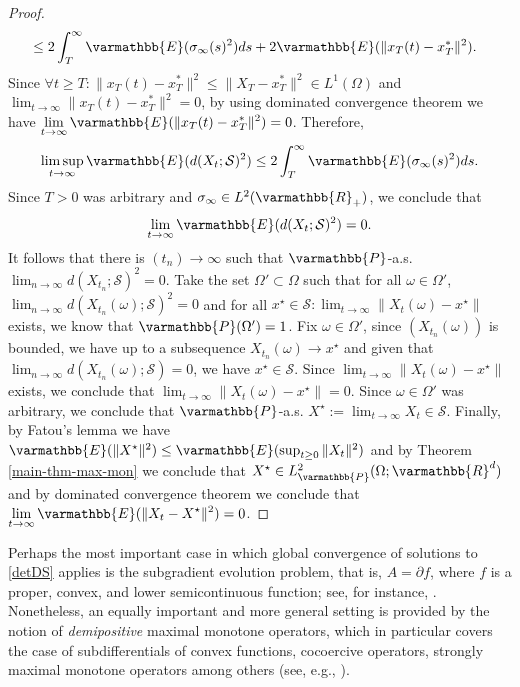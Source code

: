 \documentclass[11pt,reqno]{article}
\let\mathbb=\varmathbb
\newcommand{\R}{\mathbb{R}}
\newcommand{\1}{\mathds{1}}
\numberwithin{equation}{section}  %
\theoremstyle{plain}
\theoremstyle{definition}
\theoremstyle{remark}
\numberwithin{theorem}{section}
\numberwithin{remark}{section}
\numberwithin{example}{section}
\begin{document}
\begin{proof}
\begin{equation*}
\begin{aligned}
        &\leq 2\int_T^\infty \mathbb{E}(\sigma_\infty(s)^2) ds + 2\mathbb{E}(\|x_T(t)-x_T^\ast\|^2). 
    \end{aligned}
\end{equation*}
Since $\forall t\geq T : \|x_T(t)-x_T^\ast\|^2\leq \|X_T-x_T^\ast\|^2\in L^1(\Omega)$ and $\displaystyle\lim_{t\to \infty}\|x_T(t)-x_T^\ast\|^2 = 0$, by using dominated convergence theorem we have $\displaystyle\lim_{t\to \infty}\mathbb{E}(\|x_T(t)-x_T^\ast\|^2) = 0$. Therefore,
\begin{equation*}
    \limsup_{t\to \infty}\mathbb{E}(d(X_t;\mathcal{S})^2)\leq 2\int_T^\infty \mathbb{E}(\sigma_\infty(s)^2) ds.
\end{equation*}
 Since $T>0$ was arbitrary and $\sigma_\infty\in L^2(\R_+)$, we conclude that
\begin{equation*}
    \lim_{t\to \infty}\mathbb{E}(d(X_t;\mathcal{S})^2) = 0.
\end{equation*}
It follows that there is $(t_n)\to \infty$ such that $\mathbb{P}$-a.s. $\displaystyle\lim_{n\to \infty}d(X_{t_n};\mathcal{S})^2 = 0$. Take the set $\Omega'\subset\Omega$ such that for all $\omega\in \Omega'$, $\displaystyle\lim_{n\to \infty}d(X_{t_n}(\omega);\mathcal{S})^2 = 0$ and for all $\displaystyle x^\star\in \mathcal{S} : \lim_{t\to \infty}\|X_t(\omega)-x^\star\| $ exists, we know that $\mathbb{P}(\Omega') = 1$. Fix $\omega\in \Omega'$, since  $(X_{t_n}(\omega))$ is bounded, we have up to a subsequence $X_{t_n}(\omega)\to x^\star$ and given that $\displaystyle \lim_{n\to \infty}d(X_{t_n}(\omega);\mathcal{S})=0$, we have $x^\star\in \mathcal{S}$. Since $\displaystyle\lim_{t\to \infty}\|X_t(\omega)-x^\star\|$ exists, we conclude that $\displaystyle\lim_{t\to \infty}\|X_t(\omega)-x^\star\| = 0$. Since $\omega\in \Omega'$ was arbitrary, we conclude that $\mathbb{P}$-a.s. $\displaystyle X^\star :=\lim_{t\to \infty} X_t\in\mathcal{S}$. Finally, by Fatou's lemma we have $\mathbb{E}(\|X^\star\|^2)\leq \mathbb{E}(\sup_{t\geq 0}\|X_t\|^2)$ and by Theorem \ref{main-thm-max-mon} we conclude that $X^\star\in L^2_{\mathbb{P}}(\Omega;\R^d)$ and by dominated convergence theorem we conclude that $\displaystyle\lim_{t\to \infty}\mathbb{E}(\|X_t-X^\star\|^2) = 0$.
\end{proof}

Perhaps the most important case in which global convergence of solutions to \eqref{detDS} applies is the
subgradient evolution problem, that is,  $A = \partial f$, where $f$ is a proper, convex, and lower semicontinuous
function; see, for instance, \cite{MR755330}. Nonetheless, an equally important and more general setting
is provided by the notion of \emph{demipositive} maximal monotone operators, which in particular covers
the case of subdifferentials of convex functions, cocoercive operators, strongly maximal monotone operators among others  (see, e.g., \cite[Proposition 6.2]{MR2731260}).
\end{document}
